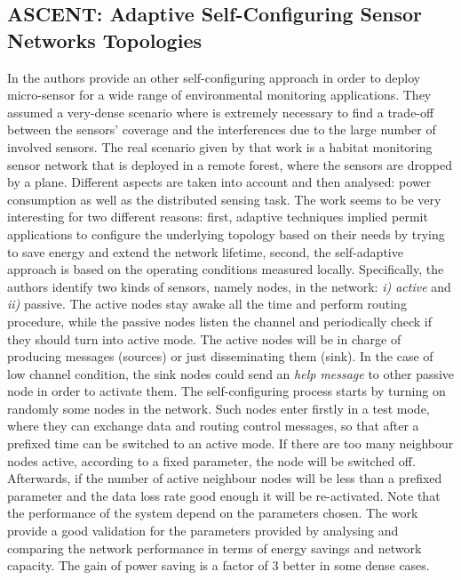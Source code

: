 \subsection*{ASCENT: Adaptive Self-Configuring Sensor Networks Topologies}
In \cite{ascent} the authors provide an other self-configuring approach in order to deploy micro-sensor for a wide range of environmental monitoring applications. They assumed a very-dense scenario where is extremely necessary to find a trade-off between the sensors' coverage and the interferences due to the large number of involved sensors. The real scenario given by that work is a habitat monitoring sensor network that is deployed in a remote forest, where the sensors are dropped by a plane.
Different aspects are taken into account and then analysed: power consumption as well as the distributed sensing task. The work seems to be very interesting for two different reasons: first, adaptive techniques implied permit applications to configure the underlying topology based on their needs by trying to save energy and extend the network lifetime, second, the self-adaptive approach is based on the operating conditions measured locally.
Specifically, the authors identify two kinds of sensors, namely nodes, in the network: \textit{i) active} and \textit{ii)} passive. The active nodes stay awake all the time and perform routing procedure, while the passive nodes listen the channel and periodically check if they should turn into active mode. The active nodes will be in charge of producing messages (sources) or just disseminating them (sink). In the case of low channel condition, the sink nodes could send an \textit{help message} to other passive node in order to activate them.
The self-configuring process starts by turning on randomly some nodes in the network. Such nodes enter firstly in a test mode, where they can exchange data and routing control messages, so that after a prefixed time can be switched to an active mode. If there are too many neighbour nodes active, according to a fixed parameter, the node will be switched off. Afterwards, if the number of active neighbour nodes will be less than a prefixed parameter and the data loss rate good enough it will be re-activated. 
Note that the performance of the system depend on the parameters chosen. The work provide a good validation for the parameters provided by analysing and comparing the network performance in terms of energy savings and network capacity. The gain of power saving is a factor of $3$ better in some dense cases.
